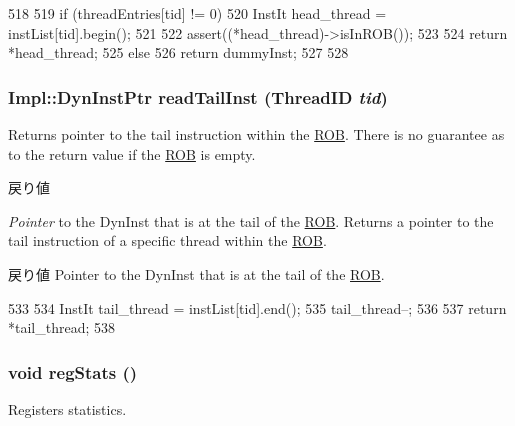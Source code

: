 \begin{DoxyCode}
518 {
519     if (threadEntries[tid] != 0) {
520         InstIt head_thread = instList[tid].begin();
521 
522         assert((*head_thread)->isInROB());
523 
524         return *head_thread;
525     } else {
526         return dummyInst;
527     }
528 }
\end{DoxyCode}
\hypertarget{classROB_a6da43edd5511d34476626974724a32bf}{
\subsubsection[{readTailInst}]{\setlength{\rightskip}{0pt plus 5cm}Impl::DynInstPtr readTailInst ({\bf ThreadID} {\em tid})}}
\label{classROB_a6da43edd5511d34476626974724a32bf}
Returns pointer to the tail instruction within the \hyperlink{classROB}{ROB}. There is no guarantee as to the return value if the \hyperlink{classROB}{ROB} is empty. 
\begin{DoxyRetVals}{戻り値}
\item[{\em Pointer}]to the DynInst that is at the tail of the \hyperlink{classROB}{ROB}. Returns a pointer to the tail instruction of a specific thread within the \hyperlink{classROB}{ROB}. \end{DoxyRetVals}
\begin{DoxyReturn}{戻り値}
Pointer to the DynInst that is at the tail of the \hyperlink{classROB}{ROB}. 
\end{DoxyReturn}



\begin{DoxyCode}
533 {
534     InstIt tail_thread = instList[tid].end();
535     tail_thread--;
536 
537     return *tail_thread;
538 }
\end{DoxyCode}
\hypertarget{classROB_a4dc637449366fcdfc4e764cdf12d9b11}{
\subsubsection[{regStats}]{\setlength{\rightskip}{0pt plus 5cm}void regStats ()}}
\label{classROB_a4dc637449366fcdfc4e764cdf12d9b11}
Registers statistics. 


